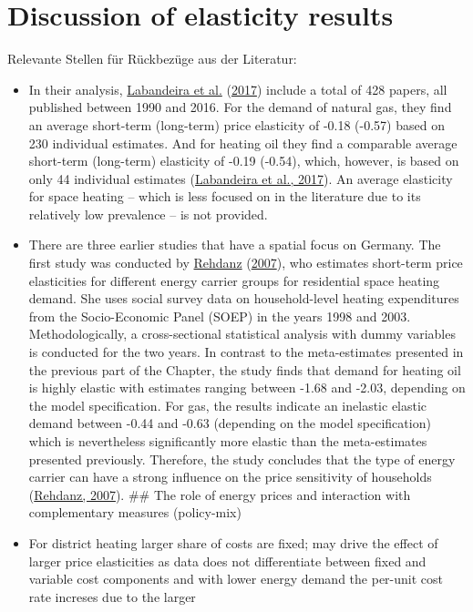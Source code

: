\documentclass[12pt,twoside]{reedthesis}
\begin{document}
\hypertarget{discussion-of-elasticity-results}{%
\section{Discussion of elasticity results}\label{discussion-of-elasticity-results}}

Relevante Stellen für Rückbezüge aus der Literatur:
\begin{itemize}
\item
  In their analysis, \protect\hyperlink{ref-labandeira_etal17}{Labandeira et al.} (\protect\hyperlink{ref-labandeira_etal17}{2017}) include a total of 428 papers, all published between 1990 and 2016. For the demand of natural gas, they find an average short-term (long-term) price elasticity of -0.18 (-0.57) based on 230 individual estimates. And for heating oil they find a comparable average short-term (long-term) elasticity of -0.19 (-0.54), which, however, is based on only 44 individual estimates (\protect\hyperlink{ref-labandeira_etal17}{Labandeira et al., 2017}). An average elasticity for space heating -- which is less focused on in the literature due to its relatively low prevalence -- is not provided.
\item
  There are three earlier studies that have a spatial focus on Germany. The first study was conducted by \protect\hyperlink{ref-rehdanz07}{Rehdanz} (\protect\hyperlink{ref-rehdanz07}{2007}), who estimates short-term price elasticities for different energy carrier groups for residential space heating demand. She uses social survey data on household-level heating expenditures from the Socio-Economic Panel (SOEP) in the years 1998 and 2003. Methodologically, a cross-sectional statistical analysis with dummy variables is conducted for the two years. In contrast to the meta-estimates presented in the previous part of the Chapter, the study finds that demand for heating oil is highly elastic with estimates ranging between -1.68 and -2.03, depending on the model specification. For gas, the results indicate an inelastic elastic demand between -0.44 and -0.63 (depending on the model specification) which is nevertheless significantly more elastic than the meta-estimates presented previously. Therefore, the study concludes that the type of energy carrier can have a strong influence on the price sensitivity of households (\protect\hyperlink{ref-rehdanz07}{Rehdanz, 2007}).
  \#\# The role of energy prices and interaction with complementary measures (policy-mix)
\item
  For district heating larger share of costs are fixed; may drive the effect of larger price elasticities as data does not differentiate between fixed and variable cost components and with lower energy demand the per-unit cost rate increses due to the larger

\end{itemize}
\end{document}
